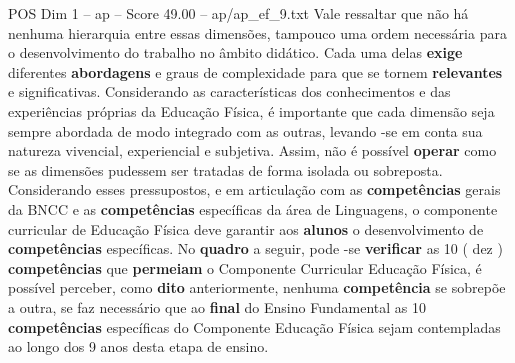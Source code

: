 \begin{textsample}{POS Dim 1 – ap – Score 49.00 – ap/ap\_ef\_9.txt}
Vale ressaltar que não há nenhuma hierarquia entre essas dimensões, tampouco uma ordem necessária para o desenvolvimento do trabalho no âmbito didático.
Cada uma delas \textbf{exige} diferentes \textbf{abordagens} e graus de complexidade para que se tornem \textbf{relevantes} e significativas.
Considerando as características dos conhecimentos e das experiências próprias da Educação Física, é importante que cada dimensão seja sempre abordada de modo integrado com as outras, levando -se em conta sua natureza vivencial, experiencial e subjetiva.
Assim, não é possível \textbf{operar} como se as dimensões pudessem ser tratadas de forma isolada ou sobreposta.
Considerando esses pressupostos, e em articulação com as \textbf{competências} gerais da BNCC e as \textbf{competências} específicas da área de Linguagens, o componente curricular de Educação Física deve garantir aos \textbf{alunos} o desenvolvimento de \textbf{competências} específicas.
No \textbf{quadro} a seguir, pode -se \textbf{verificar} as 10 ( dez ) \textbf{competências} que \textbf{permeiam} o Componente Curricular Educação Física, é possível perceber, como \textbf{dito} anteriormente, nenhuma \textbf{competência} se sobrepõe a outra, se faz necessário que ao \textbf{final} do Ensino Fundamental as 10 \textbf{competências} específicas do Componente Educação Física sejam contempladas ao longo dos 9 anos desta etapa de ensino.

\end{textsample}
